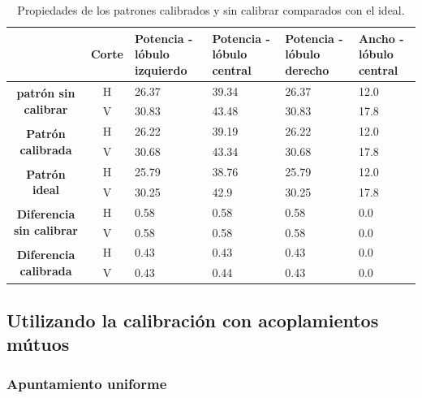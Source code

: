 \begin{table}[H]
  \footnotesize
  \centering
  \begin{tabular}{|c|c|p{2cm}|p{2cm}|p{2cm}|p{2cm}|}
    \cline{2-6}
    \multicolumn{1}{c|}{} & \textbf{Corte} & \textbf{Potencia - lóbulo izquierdo} & \textbf{Potencia - lóbulo central} &
    \textbf{Potencia - lóbulo derecho} & \textbf{Ancho - lóbulo central} \tabularnewline\hline
    \multirow{2}{*}{\textbf{patrón sin calibrar}} & H & 26.37 & 39.34 & 26.37 & 12.0 \tabularnewline\cline{2-6}
     & V & 30.83 & 43.48 & 30.83 & 17.8 \tabularnewline\hline
    \multirow{2}{*}{\textbf{Patrón calibrada}} & H & 26.22 & 39.19 & 26.22 & 12.0 \tabularnewline\cline{2-6}
     & V & 30.68 & 43.34 & 30.68 & 17.8 \tabularnewline\hline
    \multirow{2}{*}{\textbf{Patrón ideal}} & H & 25.79 & 38.76 & 25.79 & 12.0 \tabularnewline\cline{2-6}
     & V & 30.25 & 42.9 & 30.25 & 17.8 \tabularnewline\hline
    \multirow{2}{*}{\textbf{Diferencia sin calibrar}} & H & 0.58 & 0.58 & 0.58 & 0.0\tabularnewline\cline{2-6}
     & V & 0.58 & 0.58 & 0.58 & 0.0 \tabularnewline\hline
    \multirow{2}{*}{\textbf{Diferencia calibrada}} & H & 0.43 & 0.43 & 0.43 & 0.0 \tabularnewline\cline{2-6}
     & V & 0.43 & 0.44 & 0.43 & 0.0 \tabularnewline\hline
  \end{tabular}
  \caption{Propiedades de los patrones calibrados y sin calibrar comparados con el ideal.}
  \label{tab:nonErrClassical10degRow}
\end{table}


\subsection{Utilizando la calibración con acoplamientos mútuos}


\subsubsection{Apuntamiento uniforme}

